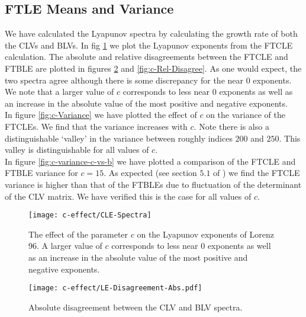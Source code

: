 \subsection{FTLE Means and Variance}

We have calculated the Lyapunov spectra by calculating the growth rate of both the CLVs and BLVs. In fig \ref{fig:c-effect-CLE} we plot the Lyapunov exponents from the FTCLE calculation. The absolute and relative disagreements between the FTCLE and FTBLE are plotted in figures \ref{fig:c-Abs-Disagree} and \ref{fig:c-Rel-Disagree}. As one would expect, the two spectra agree although there is some discrepancy for the near $0$ exponents.\\

We note that a larger value of $c$ corresponds to less near $0$ exponents as well as an increase in the absolute value of the most positive and negative exponents.\\

In figure \ref{fig:c-Variance} we have plotted the effect of $c$ on the variance of the FTCLEs. We find that the variance increases with $c$. Note there is also a distinguishable `valley' in the variance between roughly indices $200$ and $250$. This valley is distinguishable for all values of $c$.\\

In figure \ref{fig:c-variance-c-vs-b} we have plotted a comparison of the FTCLE and FTBLE variance for $c = 15$. As expected (see section $5.1$ of \cite{Pikovsky2016}) we find the FTCLE variance is higher than that of the FTBLEs due to fluctuation of the determinant of the CLV matrix. We have verified this is the case for all values of $c$.

\begin{figure}
\centering
\texttt{[image: c-effect/CLE-Spectra]}
\caption{The effect of the parameter $c$ on the Lyapunov exponents of Lorenz $96$. A larger value of $c$ corresponds to less near $0$ exponents as well as an increase in the absolute value of the most positive and negative exponents.}
\label{fig:c-effect-CLE}
\end{figure}

\begin{figure}
	\centering
    \texttt{[image: c-effect/LE-Disagreement-Abs.pdf]}
    \caption{Absolute disagreement between the CLV and BLV spectra.}
    \label{fig:c-Abs-Disagree}
\end{figure}

